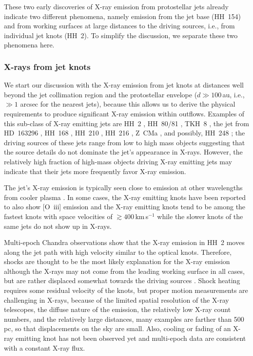 \documentclass[graybox, nosecnum]{svmult}
\begin{document}
These two early discoveries of X-ray emission  from protostellar jets already indicate two different phenomena, namely emission from the jet base (HH~154) and from working surfaces at large distances to the driving sources, i.e., from individual jet knots (HH~2). To simplify the discussion, we separate these two phenomena here.


\subsubsection{X-rays from jet knots}

We start our discussion with the X-ray emission from jet knots at distances well beyond the jet collimation region and the protostellar envelope ($d\gg100\,$au, i.e., $\gg1$ arcsec for the nearest jets), because this allows us to derive the physical requirements to produce significant X-ray emission within outflows. Examples of this sub-class of X-ray emitting jets are HH~2 \citep{Pravdo_2001}, HH~80/81 \citep{Pravdo_2004}, TKH~8 \citep{Tsujimoto_2004}, the jet from HD~163296 \citep[HH~409, see ][]{Swartz_2005,Guenther_2013},   HH~168 \citep{Pravdo_2005,Schneider_2009}, HH~210 \citep{Grosso_2006}, HH~216 \citep{Linsky_2007}, Z~CMa \citep{Stelzer_2009}, and possibly, HH~248 \citep{Lopez_2015}; the driving sources of these jets range from low to high mass objects suggesting that 
the source details do not dominate the jet's appearance in X-rays. However, the relatively high fraction of high-mass objects driving X-ray emitting jets may indicate that their jets more frequently favor X-ray emission. 


The jet's X-ray emission is typically seen close to emission at other wavelengths from cooler plasma   \citep[$T\sim10^4$\,K, e.g.,][]{Pravdo_2004,Grosso_2006,Schneider_2012}.  In some cases, the X-ray emitting knots have been reported to also show [O~{\sc iii}] emission \citep[$T\sim10^5$\,K, see ][]{Grosso_2006}  and the X-ray emitting knots tend to be among the fastest knots with space velocities of $\gtrsim400$\,km\,s$^{-1}$ \citep[e.g.,][]{Pravdo_2001} while the slower knots of the same jets do not show up in X-rays. 

Multi-epoch Chandra observations show that the X-ray emission in HH~2  moves along the jet path with high velocity \citep{Schneider_2012} similar to the optical knots.  Therefore, shocks are thought to be the most likely explanation for the X-ray emission  although the X-rays may not come from the leading working surface in all cases, but are rather displaced somewhat towards the driving sources \citep[][]{Pravdo_2005}. Shock heating requires some residual velocity of the knots, but proper motion measurements are challenging in X-rays, because of the limited spatial resolution of the X-ray telescopes,  the diffuse nature of the emission, the relatively low X-ray count numbers, and the relatively large distances, many examples are farther than 500\,pc, so that displacements on the sky are small. Also, cooling or fading of an X-ray emitting knot has not been observed yet and multi-epoch data are consistent with a constant X-ray flux.
\end{document}
